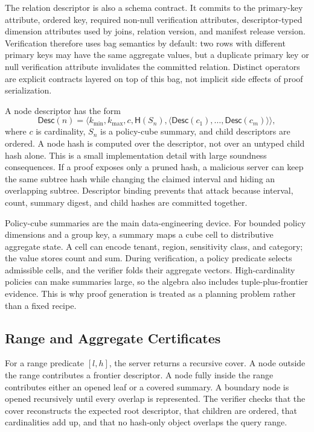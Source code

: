 \documentclass[conference]{IEEEtran}
\newcommand{\hash}{\mathsf{H}}
\newcommand{\desc}{\mathsf{Desc}}
\begin{document}
The relation descriptor is also a schema contract. It commits to the primary-key attribute, ordered key, required non-null verification attributes, descriptor-typed dimension attributes used by joins, relation version, and manifest release version. Verification therefore uses bag semantics by default: two rows with different primary keys may have the same aggregate values, but a duplicate primary key or null verification attribute invalidates the committed relation. Distinct operators are explicit contracts layered on top of this bag, not implicit side effects of proof serialization.

A node descriptor has the form
\begin{equation}
\desc(n)=\langle k_{\min},k_{\max},c,\hash(S_n),\langle \desc(c_1),\ldots,\desc(c_m)\rangle\rangle,
\end{equation}
where $c$ is cardinality, $S_n$ is a policy-cube summary, and child descriptors are ordered. A node hash is computed over the descriptor, not over an untyped child hash alone. This is a small implementation detail with large soundness consequences. If a proof exposes only a pruned hash, a malicious server can keep the same subtree hash while changing the claimed interval and hiding an overlapping subtree. Descriptor binding prevents that attack because interval, count, summary digest, and child hashes are committed together.

Policy-cube summaries are the main data-engineering device. For bounded policy dimensions and a group key, a summary maps a cube cell to distributive aggregate state. A cell can encode tenant, region, sensitivity class, and category; the value stores count and sum. During verification, a policy predicate selects admissible cells, and the verifier folds their aggregate vectors. High-cardinality policies can make summaries large, so the algebra also includes tuple-plus-frontier evidence. This is why proof generation is treated as a planning problem rather than a fixed recipe.

\subsection{Range and Aggregate Certificates}
For a range predicate $[l,h]$, the server returns a recursive cover. A node outside the range contributes a frontier descriptor. A node fully inside the range contributes either an opened leaf or a covered summary. A boundary node is opened recursively until every overlap is represented. The verifier checks that the cover reconstructs the expected root descriptor, that children are ordered, that cardinalities add up, and that no hash-only object overlaps the query range.
\end{document}

